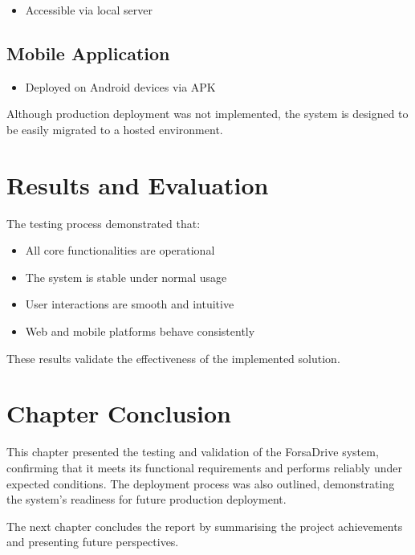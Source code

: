 \begin{itemize}[noitemsep]
    \item Accessible via local server
\end{itemize}

\subsection{Mobile Application}

\begin{itemize}[noitemsep]
    \item Deployed on Android devices via APK
\end{itemize}

Although production deployment was not implemented, the system is designed to be easily migrated to a hosted environment.

\section{Results and Evaluation}

The testing process demonstrated that:

\begin{itemize}[noitemsep]
    \item All core functionalities are operational
    \item The system is stable under normal usage
    \item User interactions are smooth and intuitive
    \item Web and mobile platforms behave consistently
\end{itemize}

These results validate the effectiveness of the implemented solution.

\section*{Chapter Conclusion}

This chapter presented the testing and validation of the ForsaDrive system, confirming that it meets its functional requirements and performs reliably under expected conditions. The deployment process was also outlined, demonstrating the system's readiness for future production deployment.

The next chapter concludes the report by summarising the project achievements and presenting future perspectives.